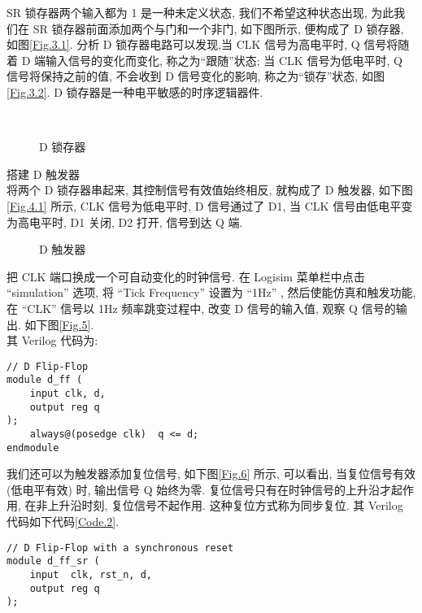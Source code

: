 \documentclass[UTF8,fontset=fandol]{ctexart}
\begin{document}
\begin{ExSteps}
    SR 锁存器两个输入都为 1 是一种未定义状态, 我们不希望这种状态出现, 为此我们在 SR 锁存器前面添加两个与门和一个非门, 如下图所示, 便构成了 D 锁存器, 如图\ref{Fig.3.1}.
    分析 D 锁存器电路可以发现,当 CLK 信号为高电平时, Q 信号将随着 D 端输入信号的变化而变化, 称之为“跟随”状态; 当 CLK 信号为低电平时, Q 信号将保持之前的值, 不会收到 D 信号变化的影响, 称之为“锁存”状态, 如图\ref{Fig.3.2}. D 锁存器是一种电平敏感的时序逻辑器件.
    \begin{figure}[htbp]
      \centering
      \\
      \caption{D 锁存器}
      \label{Fig.3}
    \end{figure}
    \step 搭建 D 触发器\\
    将两个 D 锁存器串起来, 其控制信号有效值始终相反, 就构成了 D 触发器, 如下图\ref{Fig.4.1} 所示, CLK 信号为低电平时, D 信号通过了 D1, 当 CLK 信号由低电平变为高电平时, D1 关闭, D2 打开, 信号到达 Q 端. 
    \begin{figure}[h]
      \centering
      \caption{D 触发器}
      \label{Fig.4}
    \end{figure}
    把 CLK 端口换成一个可自动变化的时钟信号. 在 Logisim 菜单栏中点击 ``simulation'' 选项, 将 ``Tick Frequency'' 设置为 ``1Hz'' , 然后使能仿真和触发功能, 在 ``CLK'' 信号以 1Hz 频率跳变过程中, 改变 D 信号的输入值, 观察 Q 信号的输出. 如下图\ref{Fig.5}.
    \\其 Verilog 代码为:
    \begin{lstlisting}[style=verilogstyle, caption={D 触发器}, label={Code.1}]
// D Flip-Flop
module d_ff (
    input clk, d,
    output reg q 
);
    always@(posedge clk)  q <= d;
endmodule
    \end{lstlisting}
    我们还可以为触发器添加复位信号, 如下图\ref{Fig.6} 所示, 可以看出, 当复位信号有效 (低电平有效) 时, 输出信号 Q 始终为零.
    复位信号只有在时钟信号的上升沿才起作用, 在非上升沿时刻, 复位信号不起作用. 这种复位方式称为同步复位. 其 Verilog 代码如下代码\ref{Code.2}.\\
    \begin{lstlisting}[style=verilogstyle, caption={同步复位 D 触发器}, label={Code.2}]
// D Flip-Flop with a synchronous reset
module d_ff_sr (
    input  clk, rst_n, d,
    output reg q 
);

\end{lstlisting}
\end{ExSteps}
\end{document}
